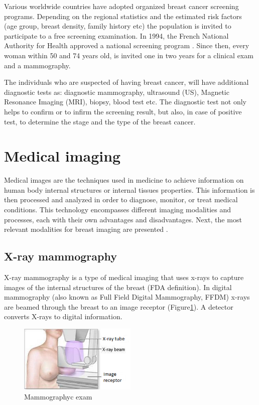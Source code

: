 Various worldwide countries have adopted organized breast cancer screening programs. Depending on the regional statistics and the estimated risk factors (age group, breast density, family history etc) the population is invited to participate to a free screening examination. In 1994, the French National Authority for Health approved a national screening program \citep{HAS_2016}. Since then, every woman within 50 and 74 years old, is invited one in two years for a clinical exam and a mammography.

The individuals who are suspected of having breast cancer, will have additional diagnostic tests as: diagnostic mammography, ultrasound (US), Magnetic Resonance Imaging (MRI), biopsy, blood test etc. The diagnostic test  not only helps to confirm or to infirm the screening result, but also, in case of positive test, to determine the stage and the type of the breast cancer.
\section{Medical imaging}\label{section:medicalimaging}
 
Medical images are the techniques used in medicine to achieve information on human body internal structures or internal tissues properties. This information is then processed and analyzed in order to diagnose, monitor, or treat medical conditions. This technology encompasses different imaging modalities and processes, each with their own advantages and disadvantages. Next, the most relevant modalities for breast imaging are presented .

 

\subsection{X-ray mammography}\label{subsection:mammography}

X-ray mammography is a type of medical imaging that uses x-rays to capture images of the internal structures of the breast (FDA  definition). In digital mammography (also known as Full Field Digital Mammography, FFDM) x-rays are beamed through the breast to an image receptor (Figure\ref{fig:mammographyc ecam}). A detector converts X-rays to digital information. 

	
\begin{figure}[!h]
\centering
\includegraphics[width=0.5\textwidth,keepaspectratio]{figures/xraymammo.PNG} 
\caption[Mammographyc exam]{Mammographyc exam}
\label{fig:mammographyc ecam}
\end{figure} 

